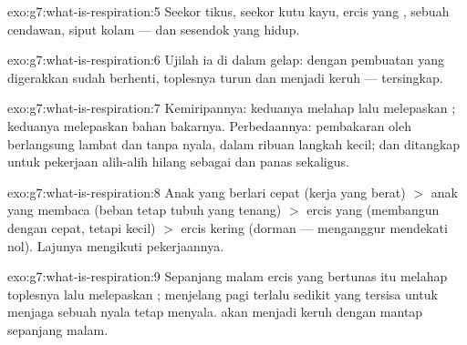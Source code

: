 \begin{solution}{exo:g7:what-is-respiration:5}
Seekor tikus, seekor kutu kayu, ercis yang , sebuah
cendawan, siput kolam --- dan sesendok  yang hidup.
\end{solution}

\begin{solution}{exo:g7:what-is-respiration:6}
Ujilah ia di dalam gelap: dengan pembuatan yang digerakkan 
sudah berhenti,  toplesnya turun dan  menjadi keruh
---  tersingkap.
\end{solution}

\begin{solution}{exo:g7:what-is-respiration:7}
Kemiripannya: keduanya melahap  lalu melepaskan ; keduanya melepaskan  bahan bakarnya. Perbedaannya:
pembakaran oleh  berlangsung lambat dan tanpa nyala, dalam
ribuan langkah kecil; dan  ditangkap untuk pekerjaan alih-alih
hilang sebagai  dan panas sekaligus.
\end{solution}

\begin{solution}{exo:g7:what-is-respiration:8}
Anak yang berlari cepat (kerja  yang berat) $>$ anak yang membaca
(beban tetap tubuh yang tenang) $>$ ercis yang  (membangun
dengan cepat, tetapi kecil) $>$ ercis kering (dorman --- 
menganggur mendekati nol). Lajunya mengikuti pekerjaannya.
\end{solution}

\begin{solution}{exo:g7:what-is-respiration:9}
Sepanjang malam  ercis yang bertunas itu melahap 
toplesnya lalu melepaskan ; menjelang pagi terlalu
sedikit  yang tersisa untuk menjaga sebuah nyala tetap menyala.
 akan menjadi keruh dengan mantap sepanjang malam.
\end{solution}

